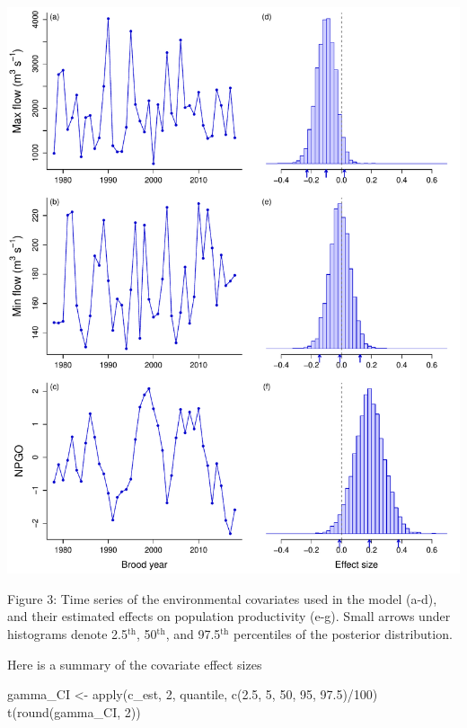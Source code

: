 \documentclass[
  11pt,
]{article}
\newenvironment{Shaded}{}{}
\newcommand{\DecValTok}[1]{#1}
\newcommand{\FloatTok}[1]{#1}
\newcommand{\KeywordTok}[1]{\textcolor[rgb]{0.00,0.00,1.00}{#1}}
\newcommand{\NormalTok}[1]{#1}
\newcommand{\OperatorTok}[1]{#1}
\newcommand{\StringTok}[1]{\textcolor[rgb]{0.00,0.50,0.50}{#1}}
\begin{document}
\begin{center}\includegraphics{App_3_Summarize_results_forecast_2020_2021_files/figure-latex/fig_4_cov_effects-1} \end{center}

Figure 3: Time series of the environmental covariates used in the model
(a-d), and their estimated effects on population productivity (e-g).
Small arrows under histograms denote 2.5\(^\text{th}\),
50\(^\text{th}\), and 97.5\(^\text{th}\) percentiles of the posterior
distribution.

Here is a summary of the covariate effect sizes

\begin{Shaded}
\begin{Highlighting}[]
\NormalTok{gamma_CI <-}\StringTok{ }\KeywordTok{apply}\NormalTok{(c_est, }\DecValTok{2}\NormalTok{, quantile, }\KeywordTok{c}\NormalTok{(}\FloatTok{2.5}\NormalTok{, }\DecValTok{5}\NormalTok{, }\DecValTok{50}\NormalTok{, }\DecValTok{95}\NormalTok{, }\FloatTok{97.5}\NormalTok{)}\OperatorTok{/}\DecValTok{100}\NormalTok{)}
\KeywordTok{t}\NormalTok{(}\KeywordTok{round}\NormalTok{(gamma_CI, }\DecValTok{2}\NormalTok{))}
\end{Highlighting}
\end{Shaded}
\end{document}
